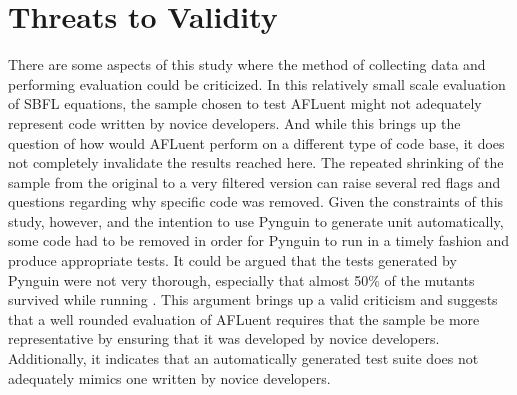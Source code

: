 \section{Threats to Validity}

There are some aspects of this study where the method of collecting data and
performing evaluation could be criticized. In this relatively small scale
evaluation of SBFL equations, the sample chosen to test AFLuent might not
adequately represent code written by novice developers. And while this brings up
the question of how would AFLuent perform on a different type of code base, it
does not completely invalidate the results reached here. The repeated shrinking of the
sample from the original  to a very filtered version
can raise several red flags and questions regarding why specific code was
removed. Given the constraints of this study, however, and the intention to
use Pynguin to generate unit automatically, some code had to be removed in order
for Pynguin to run in a timely fashion and produce appropriate tests. It could
be argued that the tests generated by Pynguin were not very thorough, especially
that almost 50\% of the mutants survived while running . This
argument brings up a valid criticism and suggests that a well rounded evaluation
of AFLuent requires that the sample be more representative by ensuring that it
was developed by novice developers. Additionally, it indicates that an automatically generated
test suite does not adequately mimics one written by novice developers.
